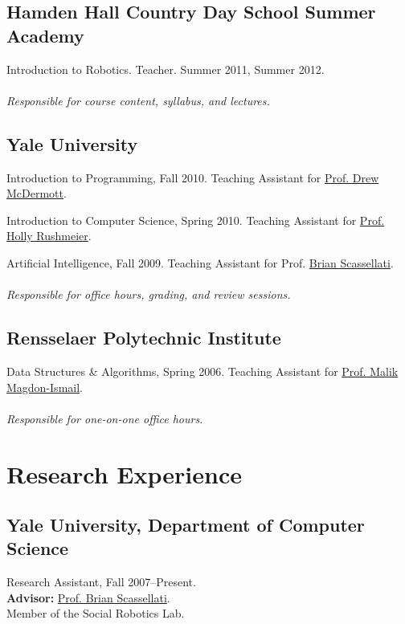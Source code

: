 \documentclass[10pt,letterpaper]{article}
\renewenvironment{itemize}{
  \begin{list}{}{
    \setlength{\leftmargin}{1.5em}
    \setlength{\itemsep}{0.25em}
    \setlength{\parskip}{0pt}
    \setlength{\parsep}{0.25em}
  }
}{
  \end{list}
}
\begin{document}
\subsection*{Hamden Hall Country Day School Summer Academy}
\begin{itemize}
\item Introduction to Robotics. Teacher. Summer 2011, Summer 2012.
\\ \\ {\it Responsible for course content, syllabus, and lectures.}
\end{itemize}

\subsection*{Yale University}
\begin{itemize}
\item Introduction to Programming, Fall 2010. Teaching Assistant for \href{http://cs-www.cs.yale.edu/homes/dvm/}{Prof. Drew McDermott}.
\item Introduction to Computer Science, Spring 2010. Teaching Assistant for \href{http://graphics.cs.yale.edu/holly/}{Prof. Holly Rushmeier}.
\item Artificial Intelligence, Fall 2009. Teaching Assistant for Prof. \href{http://cs-www.cs.yale.edu/homes/scaz/}{Brian Scassellati}.
\\ \\ {\it Responsible for office hours, grading, and review sessions.}
\end{itemize}

\subsection*{Rensselaer Polytechnic Institute}
\begin{itemize}
\item Data Structures \& Algorithms, Spring 2006. Teaching Assistant for \href{http://www.cs.rpi.edu/~magdon/}{Prof. Malik Magdon-Ismail}.
\\ \\ {\it Responsible for one-on-one office hours.}
\end{itemize}

\section*{Research Experience}

\subsection*{Yale University, Department of Computer Science}
\begin{itemize}
\item Research Assistant, Fall 2007--Present. \\
\textbf{Advisor:} \href{http://http://cs-www.cs.yale.edu/homes/scaz/}{Prof. Brian Scassellati}. \\
Member of the Social Robotics Lab.
\end{itemize}
\end{document}
